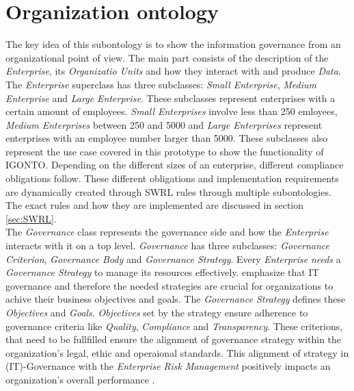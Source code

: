 \documentclass[
  a4paper,  %
  twoside,  %
  bibliography=totoc,
  headsepline,
  cleardoublepage=empty,
  parskip=half,
  draft=false
]{scrbook}
\begin{document}
\section{Organization ontology}
The key idea of this subontology is to show the information governance from an organizational point of view. The main part consists of the description of the \textit{Enterprise}, its \textit{Organizatio Units} and how they interact with and produce \textit{Data}. \\
The \textit{Enterprise} superclass has three subclasses: \textit{Small Enterprise}, \textit{Medium Enterprise} and \textit{Large Enterprise}. These subclasses represent enterprises with a certain amount of employees. \textit{Small Enterprises} involve less than 250 emloyees, \textit{Medium Enterprises} between 250 and 5000 and \textit{Large Enterprises} represent enterprises with an employee number larger than 5000. These subclasses also represent the use case covered in this prototype to show the functionality of IGONTO. Depending on the different sizes of an enterprise, different compliance obligations follow. These different obligations and implementation requirements are dynamically created through \acrshort{SWRL} rules through multiple subontologies. The exact rules and how they are implemented are discussed in section \ref{sec:SWRL}. \\

The \textit{Governance} class represents the governance side and how the \textit{Enterprise} interacts with it on a top level. \textit{Governance} has three subclasses: \textit{Governance Criterion}, \textit{Governance Body} and \textit{Governance Strategy}. Every \textit{Enterprise} \textit{needs} a \textit{Governance Strategy} to manage its resources effectively. \cite{Callahan2004} emphasize that IT governance and therefore the needed strategies are crucial for organizations to achive their business objectives and goals. The \textit{Governance Strategy} defines these \textit{Objectives} and \textit{Goals}. \textit{Objectives} set by the strategy ensure adherence to governance criteria like \textit{Quality}, \textit{Compliance} and \textit{Transparency}. These criterions, that need to be fullfilled ensure the alignment of governance strategy within the organization's legal, ethic and operaional standards. This alignment of strategy in (IT)-Governance with the \textit{Enterprise Risk Management} positively impacts an organization's overall performance \cite{Sirait2021}.\\
\end{document}
